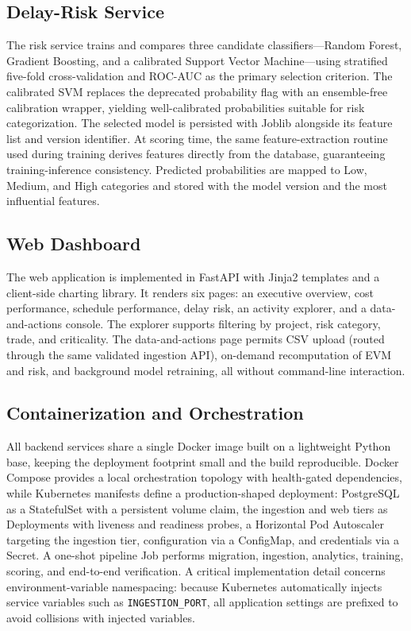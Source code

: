 \documentclass[conference]{IEEEtran}
\begin{document}
\subsection{Delay-Risk Service}

The risk service trains and compares three candidate classifiers---Random Forest, Gradient Boosting, and a calibrated Support Vector Machine---using stratified five-fold cross-validation and ROC-AUC as the primary selection criterion. The calibrated SVM replaces the deprecated probability flag with an ensemble-free calibration wrapper, yielding well-calibrated probabilities suitable for risk categorization. The selected model is persisted with Joblib alongside its feature list and version identifier. At scoring time, the same feature-extraction routine used during training derives features directly from the database, guaranteeing training-inference consistency. Predicted probabilities are mapped to Low, Medium, and High categories and stored with the model version and the most influential features.

\subsection{Web Dashboard}

The web application is implemented in FastAPI with Jinja2 templates and a client-side charting library. It renders six pages: an executive overview, cost performance, schedule performance, delay risk, an activity explorer, and a data-and-actions console. The explorer supports filtering by project, risk category, trade, and criticality. The data-and-actions page permits CSV upload (routed through the same validated ingestion API), on-demand recomputation of EVM and risk, and background model retraining, all without command-line interaction.

\subsection{Containerization and Orchestration}

All backend services share a single Docker image built on a lightweight Python base, keeping the deployment footprint small and the build reproducible. Docker Compose provides a local orchestration topology with health-gated dependencies, while Kubernetes manifests define a production-shaped deployment: PostgreSQL as a StatefulSet with a persistent volume claim, the ingestion and web tiers as Deployments with liveness and readiness probes, a Horizontal Pod Autoscaler targeting the ingestion tier, configuration via a ConfigMap, and credentials via a Secret. A one-shot pipeline Job performs migration, ingestion, analytics, training, scoring, and end-to-end verification. A critical implementation detail concerns environment-variable namespacing: because Kubernetes automatically injects service variables such as \texttt{INGESTION\_PORT}, all application settings are prefixed to avoid collisions with injected variables.
\end{document}
